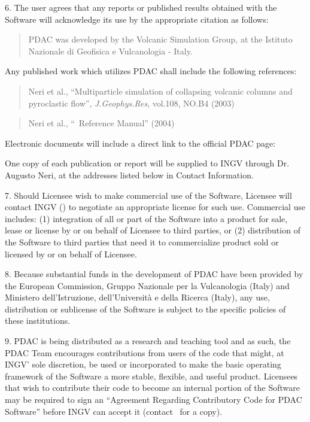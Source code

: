 6. The user agrees that any reports or published results obtained 
with the Software will acknowledge its use by the appropriate citation 
as follows: 

\begin{quote}
 PDAC was developed by the Volcanic Simulation Group,
 at the Istituto Nazionale di Geofisica e Vulcanologia - Italy.
\end{quote}

Any published work which utilizes PDAC shall include the following references: 

\begin{quote}
  Neri et al., ``Multiparticle simulation of collapsing volcanic columns 
  and pyroclastic flow'', {\em J.Geophys.Res}, vol.108, NO.B4 (2003)
\end{quote}

\begin{quote}
  Neri et al., ``\PDAC\ Reference Manual'' (2004)
\end{quote}

Electronic documents will include a direct link to the official PDAC page:

\begin{quote}
\PDACURL
\end{quote}

One copy of each publication or report will be supplied to INGV 
through Dr. Augusto Neri, at the addresses listed below in Contact 
Information.

7. Should Licensee wish to make commercial use of the Software, Licensee 
will contact INGV (\PDACADDRESS) to negotiate an appropriate 
license for such use. Commercial use includes: (1) integration of all 
or part of the Software into a product for sale, lease or license by or 
on behalf of Licensee to third parties, or (2) distribution of the 
Software to third parties that need it to commercialize product sold or 
licensed by or on behalf of Licensee.

8. Because substantial funds in the development of PDAC have been provided
by the European Commission, Gruppo Nazionale per la Vulcanologia (Italy)
and Ministero dell'Istruzione, dell'Universit\`a e della Ricerca (Italy),
any use, distribution or sublicense of the Software is subject to the specific
policies of these institutions.

9. PDAC is being distributed as a research and teaching tool and as such, 
the PDAC Team encourages contributions from users of the code that might, at 
INGV' sole discretion, be used or incorporated to make the basic 
operating framework of the Software a more stable, flexible, and
useful product. Licensees that wish to contribute their code to become 
an internal portion of the Software may be required to sign an 
``Agreement Regarding Contributory Code for PDAC Software''
before INGV can accept it (contact \PDACADDRESS\  for a copy).

